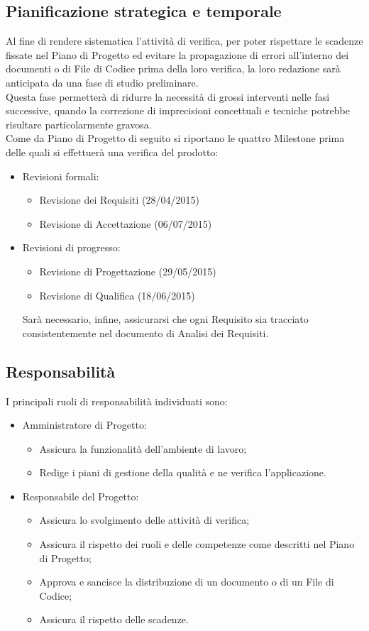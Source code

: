 {\subsection{Pianificazione strategica e temporale}{
	Al fine di rendere sistematica l'attività di verifica, per poter rispettare le scadenze fissate nel Piano di Progetto ed evitare la propagazione di errori all'interno dei documenti o di File di Codice prima della loro verifica, la loro redazione sarà anticipata da una fase di studio preliminare. \\
	Questa fase permetterà di ridurre la necessità di grossi interventi nelle fasi successive, quando la correzione di imprecisioni concettuali e tecniche potrebbe risultare particolarmente gravosa. \\
	Come da Piano di Progetto di seguito si riportano le quattro Milestone prima delle quali si effettuerà una verifica del prodotto:
	\begin{itemize}
		\item Revisioni formali:
		\begin{itemize}
			\item Revisione dei Requisiti (28/04/2015)
			\item Revisione di Accettazione (06/07/2015)
		\end{itemize}
		\item Revisioni di progresso:
		\begin{itemize}
			\item Revisione di Progettazione (29/05/2015)
			\item Revisione di Qualifica (18/06/2015)
		\end{itemize}
		Sarà necessario, infine, assicurarsi che ogni Requisito sia tracciato consistentemente nel documento di Analisi dei Requisiti.
	\end{itemize}
	}
\subsection{Responsabilità}{
I principali ruoli di responsabilità individuati sono:
\begin{itemize}
	\item Amministratore di Progetto:
	\begin{itemize}
		\item Assicura la funzionalità dell'ambiente di lavoro;
		\item Redige i piani di gestione della qualità e ne verifica l'applicazione.
	\end{itemize}
	\item Responsabile del Progetto:
	\begin{itemize}
		\item Assicura lo svolgimento delle attività di verifica;
		\item Assicura il rispetto dei ruoli e delle competenze come descritti nel Piano di Progetto;
		\item Approva e sancisce la distribuzione di un documento o di un File di Codice;
		\item Assicura il rispetto delle scadenze.
	\end{itemize}
\end{itemize}
}
}
